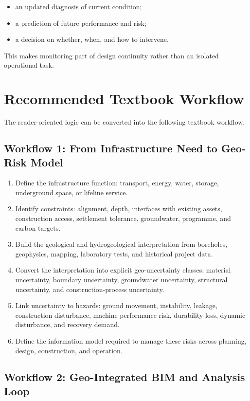 \documentclass[11pt]{article}
\begin{document}
\begin{itemize}
  \item an updated diagnosis of current condition;
  \item a prediction of future performance and risk;
  \item a decision on whether, when, and how to intervene.
\end{itemize}

This makes monitoring part of design continuity rather than an isolated
operational task.

\section{Recommended Textbook Workflow}

The reader-oriented logic can be converted into the following textbook workflow.

\subsection{Workflow 1: From Infrastructure Need to Geo-Risk Model}

\begin{enumerate}
  \item Define the infrastructure function: transport, energy, water, storage,
  underground space, or lifeline service.
  \item Identify constraints: alignment, depth, interfaces with existing assets,
  construction access, settlement tolerance, groundwater, programme, and carbon
  targets.
  \item Build the geological and hydrogeological interpretation from boreholes,
  geophysics, mapping, laboratory tests, and historical project data.
  \item Convert the interpretation into explicit geo-uncertainty classes:
  material uncertainty, boundary uncertainty, groundwater uncertainty, structural
  uncertainty, and construction-process uncertainty.
  \item Link uncertainty to hazards: ground movement, instability, leakage,
  construction disturbance, machine performance risk, durability loss, dynamic
  disturbance, and recovery demand.
  \item Define the information model required to manage these risks across
  planning, design, construction, and operation.
\end{enumerate}

\subsection{Workflow 2: Geo-Integrated BIM and Analysis Loop}
\end{document}

